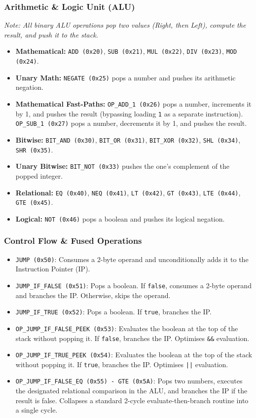 \documentclass[11pt, a4paper]{article}
\begin{document}
\subsubsection*{Arithmetic \& Logic Unit (ALU)}
\textit{Note: All binary ALU operations pop two values (Right, then Left), compute the result, and push it to the stack.}
\begin{itemize}
    \item \textbf{Mathematical:} \texttt{ADD (0x20)}, \texttt{SUB (0x21)}, \texttt{MUL (0x22)}, \texttt{DIV (0x23)}, \texttt{MOD (0x24)}.
    \item \textbf{Unary Math:} \texttt{NEGATE (0x25)} pops a number and pushes its arithmetic negation.
    \item \textbf{Mathematical Fast-Paths:} \texttt{OP\_ADD\_1 (0x26)} pops a number, increments it by 1, and pushes the result (bypassing loading \texttt{1} as a separate instruction). \texttt{OP\_SUB\_1 (0x27)} pops a number, decrements it by 1, and pushes the result.
    \item \textbf{Bitwise:} \texttt{BIT\_AND (0x30)}, \texttt{BIT\_OR (0x31)}, \texttt{BIT\_XOR (0x32)}, \texttt{SHL (0x34)}, \texttt{SHR (0x35)}.
    \item \textbf{Unary Bitwise:} \texttt{BIT\_NOT (0x33)} pushes the one's complement of the popped integer.
    \item \textbf{Relational:} \texttt{EQ (0x40)}, \texttt{NEQ (0x41)}, \texttt{LT (0x42)}, \texttt{GT (0x43)}, \texttt{LTE (0x44)}, \texttt{GTE (0x45)}.
    \item \textbf{Logical:} \texttt{NOT (0x46)} pops a boolean and pushes its logical negation.
\end{itemize}

\subsubsection*{Control Flow \& Fused Operations}
\begin{itemize}
    \item \texttt{JUMP (0x50)}: Consumes a 2-byte operand and unconditionally adds it to the Instruction Pointer (IP).
    \item \texttt{JUMP\_IF\_FALSE (0x51)}: Pops a boolean. If \texttt{false}, consumes a 2-byte operand and branches the IP. Otherwise, skips the operand.
    \item \texttt{JUMP\_IF\_TRUE (0x52)}: Pops a boolean. If \texttt{true}, branches the IP.
    \item \texttt{OP\_JUMP\_IF\_FALSE\_PEEK (0x53)}: Evaluates the boolean at the top of the stack without popping it. If \texttt{false}, branches the IP. Optimises \texttt{\&\&} evaluation.
    \item \texttt{OP\_JUMP\_IF\_TRUE\_PEEK (0x54)}: Evaluates the boolean at the top of the stack without popping it. If \texttt{true}, branches the IP. Optimises \texttt{||} evaluation.
    \item \texttt{OP\_JUMP\_IF\_FALSE\_EQ (0x55) - GTE (0x5A)}: Pops two numbers, executes the designated relational comparison in the ALU, and branches the IP if the result is false. Collapses a standard 2-cycle evaluate-then-branch routine into a single cycle.
\end{itemize}
\end{document}
